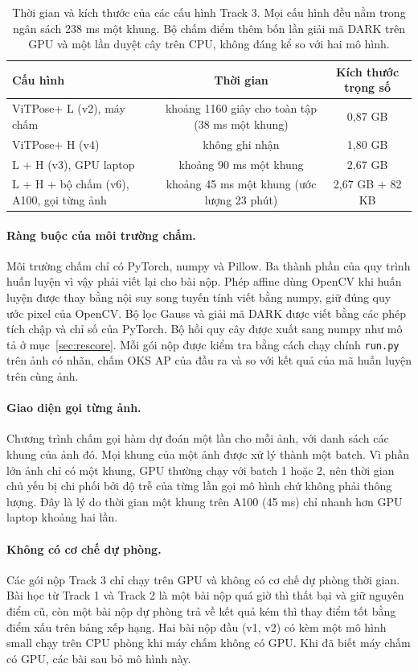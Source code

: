 \documentclass[11pt,a4paper]{article}
\begin{document}
\begin{table}[H]
\centering\small
\begin{tabularx}{\linewidth}{@{}Xcc@{}}
\toprule
Cấu hình & Thời gian & Kích thước trọng số \\
\midrule
ViTPose+ L (v2), máy chấm & khoảng 1160 giây cho toàn tập (38 ms một khung) & 0,87 GB \\
ViTPose+ H (v4) & không ghi nhận & 1,80 GB \\
L + H (v3), GPU laptop & khoảng 90 ms một khung & 2,67 GB \\
L + H + bộ chấm (v6), A100, gọi từng ảnh & khoảng 45 ms một khung (ước lượng 23 phút) & 2,67 GB + 82 KB \\
\bottomrule
\end{tabularx}
\caption{Thời gian và kích thước của các cấu hình Track 3. Mọi cấu hình đều nằm trong ngân sách 238 ms một khung. Bộ chấm điểm thêm bốn lần giải mã DARK trên GPU và một lần duyệt cây trên CPU, không đáng kể so với hai mô hình.}
\label{tab:cost}
\end{table}

\paragraph{Ràng buộc của môi trường chấm.} Môi trường chấm chỉ có PyTorch, numpy và Pillow. Ba thành phần của quy trình huấn luyện vì vậy phải viết lại cho bài nộp. Phép affine dùng OpenCV khi huấn luyện được thay bằng nội suy song tuyến tính viết bằng numpy, giữ đúng quy ước pixel của OpenCV. Bộ lọc Gauss và giải mã DARK được viết bằng các phép tích chập và chỉ số của PyTorch. Bộ hồi quy cây được xuất sang numpy như mô tả ở mục~\ref{sec:rescore}. Mỗi gói nộp được kiểm tra bằng cách chạy chính \texttt{run.py} trên ảnh có nhãn, chấm OKS AP của đầu ra và so với kết quả của mã huấn luyện trên cùng ảnh.

\paragraph{Giao diện gọi từng ảnh.} Chương trình chấm gọi hàm dự đoán một lần cho mỗi ảnh, với danh sách các khung của ảnh đó. Mọi khung của một ảnh được xử lý thành một batch. Vì phần lớn ảnh chỉ có một khung, GPU thường chạy với batch 1 hoặc 2, nên thời gian chủ yếu bị chi phối bởi độ trễ của từng lần gọi mô hình chứ không phải thông lượng. Đây là lý do thời gian một khung trên A100 (45 ms) chỉ nhanh hơn GPU laptop khoảng hai lần.

\paragraph{Không có cơ chế dự phòng.} Các gói nộp Track 3 chỉ chạy trên GPU và không có cơ chế dự phòng thời gian. Bài học từ Track 1 và Track 2 là một bài nộp quá giờ thì thất bại và giữ nguyên điểm cũ, còn một bài nộp dự phòng trả về kết quả kém thì thay điểm tốt bằng điểm xấu trên bảng xếp hạng. Hai bài nộp đầu (v1, v2) có kèm một mô hình small chạy trên CPU phòng khi máy chấm không có GPU. Khi đã biết máy chấm có GPU, các bài sau bỏ mô hình này.
\end{document}
